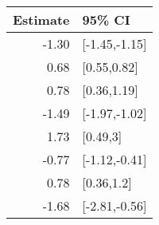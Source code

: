 \begin{tabular}{rl}
  \hline
Estimate & 95\% CI \\ 
  \hline
-1.30 & [-1.45,-1.15] \\ 
  0.68 & [0.55,0.82] \\ 
  0.78 & [0.36,1.19] \\ 
  -1.49 & [-1.97,-1.02] \\ 
  1.73 & [0.49,3] \\ 
  -0.77 & [-1.12,-0.41] \\ 
  0.78 & [0.36,1.2] \\ 
  -1.68 & [-2.81,-0.56] \\ 
   \hline
\end{tabular}

